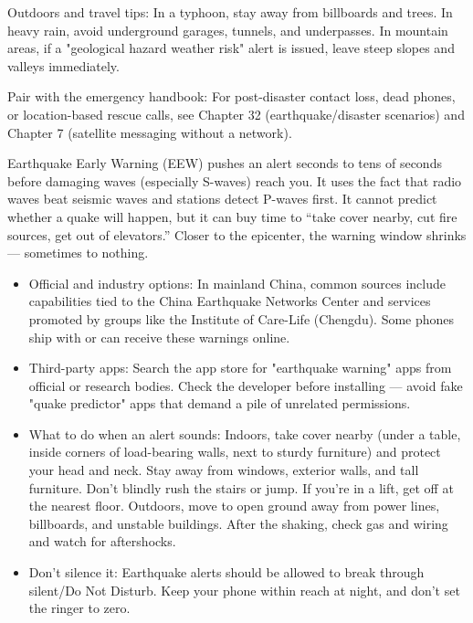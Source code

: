 Outdoors and travel tips: In a typhoon, stay away from billboards and trees. In heavy rain, avoid underground garages, tunnels, and underpasses. In mountain areas, if a "geological hazard weather risk" alert is issued, leave steep slopes and valleys immediately.

Pair with the emergency handbook: For post-disaster contact loss, dead phones, or location-based rescue calls, see Chapter 32 (earthquake/disaster scenarios) and Chapter 7 (satellite messaging without a network).


Earthquake Early Warning (EEW) pushes an alert seconds to tens of seconds before damaging waves (especially S-waves) reach you. It uses the fact that radio waves beat seismic waves and stations detect P-waves first. It cannot predict whether a quake will happen, but it can buy time to “take cover nearby, cut fire sources, get out of elevators.” Closer to the epicenter, the warning window shrinks — sometimes to nothing.

\begin{itemize}
  \item Official and industry options: In mainland China, common sources include capabilities tied to the China Earthquake Networks Center and services promoted by groups like the Institute of Care-Life (Chengdu). Some phones ship with or can receive these warnings online.
  \item Third-party apps: Search the app store for "earthquake warning" apps from official or research bodies. Check the developer before installing — avoid fake "quake predictor" apps that demand a pile of unrelated permissions.
  \item What to do when an alert sounds: Indoors, take cover nearby (under a table, inside corners of load-bearing walls, next to sturdy furniture) and protect your head and neck. Stay away from windows, exterior walls, and tall furniture. Don't blindly rush the stairs or jump. If you're in a lift, get off at the nearest floor. Outdoors, move to open ground away from power lines, billboards, and unstable buildings. After the shaking, check gas and wiring and watch for aftershocks.
  \item Don't silence it: Earthquake alerts should be allowed to break through silent/Do Not Disturb. Keep your phone within reach at night, and don't set the ringer to zero.
\end{itemize}

